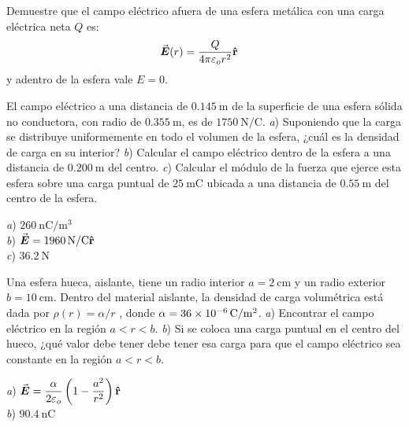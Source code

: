 %
\begin{Exercise}
  \textbf{\raisebox{.5pt}{\textcircled{\raisebox{-1.2pt} {E}}}} Demuestre que el campo eléctrico afuera de una esfera metálica con una carga eléctrica neta $Q$ es:
  \begin{align*}
    \va*{E}(r) &= \frac{Q}{4\pi\varepsilon_o r^2} \vu{r}
  \end{align*}
  y adentro de la esfera vale $E = 0$.
\end{Exercise}
%
\begin{Exercise}
  El campo eléctrico a una distancia de $\SI{0.145}{\metre}$ de la superficie de una esfera sólida no conductora, con radio de $\SI{0.355}{\metre}$, es de $\SI{1750}{\newton/\coulomb}$. \textit{a}) Suponiendo que la carga se distribuye uniformemente en todo el volumen de la esfera, ¿cuál es la densidad de carga en su interior? \textit{b}) Calcular el campo eléctrico dentro de la esfera a una distancia de $\SI{0.200}{\metre}$ del centro. \textit{c}) Calcular el módulo de la fuerza que ejerce esta esfera sobre una carga puntual de $\SI{25}{\milli\coulomb}$ ubicada a una distancia de $\SI{0.55}{\metre}$ del centro de la esfera.
\end{Exercise}
\begin{Answer}
  \begin{minipage}[t]{.4\textwidth}
    \textit{a}) $\SI{260}{\nano\coulomb/\metre\cubed}$\\ \textit{b}) $\va*{E}=\SI{1960}{\newton/\coulomb}\vu{r}$\\ \textit{c}) $\SI{36.2}{\newton}$
  \end{minipage}
\end{Answer}
%
\begin{Exercise}
  \textbf{\raisebox{.5pt}{\textcircled{\raisebox{-1.2pt} {E}}}} Una esfera hueca, aislante, tiene un radio interior $a = \SI{2}{\centi\metre}$ y un radio exterior $b = \SI{10}{\centi\metre}$. Dentro del material aislante, la densidad de carga volumétrica está dada por $\rho(r) = \alpha/ r$ , donde $\alpha = \SI{36E-6}{\coulomb/\metre\squared}$. \textit{a}) Encontrar el campo eléctrico en la región $a < r < b$. \textit{b}) Si se coloca una carga puntual en el centro del hueco, ¿qué valor debe tener debe tener esa carga para que el campo eléctrico sea constante en la región $a < r < b$.
\end{Exercise}
\begin{Answer}
  \begin{minipage}[t]{.4\textwidth}
    \textit{a}) $\va*{E} = \dfrac{\alpha}{2\varepsilon_o}\left (1 - \dfrac{a^2}{r^2} \right )\vu{r}$\\ \textit{b}) $\SI{90.4}{\nano\coulomb}$
  \end{minipage}
\end{Answer}
